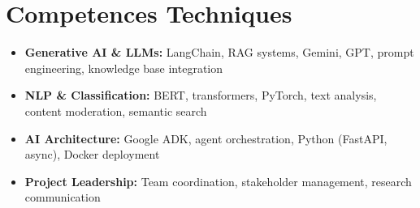 \documentclass[a4paper,11pt]{article}
\begin{document}
\section{Competences Techniques}
\begin{itemize}[leftmargin=*, nosep]
    \item \small{\textbf{Generative AI \& LLMs:} LangChain, RAG systems, Gemini, GPT, prompt engineering, knowledge base integration}
    \item \small{\textbf{NLP \& Classification:} BERT, transformers, PyTorch, text analysis, content moderation, semantic search}
    \item \small{\textbf{AI Architecture:} Google ADK, agent orchestration, Python (FastAPI, async), Docker deployment}
    \item \small{\textbf{Project Leadership:} Team coordination, stakeholder management, research communication}
\end{itemize}
\end{document}
